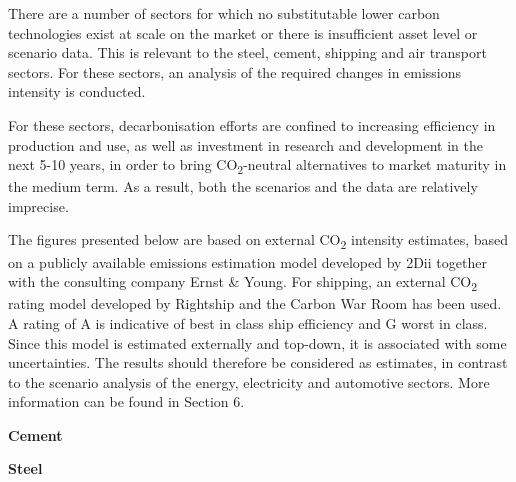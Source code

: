\documentclass[10pt,table,a4]{article}\usepackage[]{graphicx}\usepackage[]{color}
\begin{document}
	\begin{multicols}{2}
		There are a number of sectors for which no substitutable lower carbon technologies exist at scale on the market or there is insufficient asset level or scenario data. This is relevant to the steel, cement, shipping and air transport sectors. For these sectors, an analysis of the required changes in emissions intensity is conducted. 
	
		For these sectors, decarbonisation efforts are confined to increasing efficiency in production and use, as well as investment in research and development in the next 5-10 years, in order to bring CO\textsubscript{2}-neutral alternatives to market maturity in the medium term. As a result, both the scenarios and the data are relatively imprecise.
	
		The figures presented below are based on external CO\textsubscript{2} intensity estimates, based on a publicly available emissions estimation model developed by 2Dii together with the consulting company Ernst \& Young. For shipping, an external CO\textsubscript{2} rating model developed by Rightship and the Carbon War Room has been used. A rating of A is indicative of best in class ship efficiency and G worst in class. Since this model is estimated externally and top-down, it is associated with some uncertainties. The results should therefore be considered as estimates, in contrast to the scenario analysis of the energy, electricity and automotive sectors. More information can be found in Section 6. 
	\end{multicols}
	
	\begin{multicols}{2}
		
		\textbf{Cement}
		
		\textbf{Steel}
		
	\end{multicols}
	
	\setlength\multicolsep{0pt}
	\vspace{0cm}
	
\end{document}
